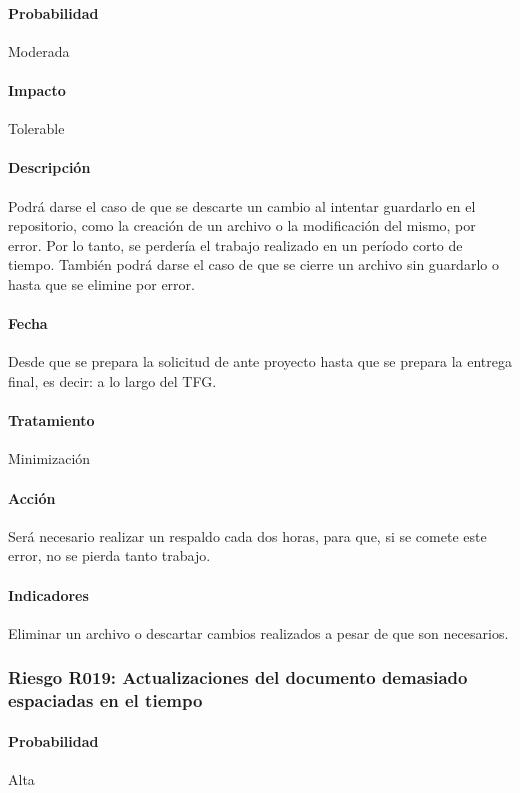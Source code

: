 \documentclass[10pt,a4paper]{article}
\begin{document}
				\paragraph{Probabilidad} Moderada
				\paragraph{Impacto}	Tolerable
				\paragraph{Descripción} Podrá darse el caso de que se descarte un cambio al intentar guardarlo en el repositorio, como la creación de un archivo o la modificación del mismo, por error. Por lo tanto, se perdería el trabajo realizado en un período corto de tiempo. También podrá darse el caso de que se cierre un archivo sin guardarlo o hasta que se elimine por error.
				\paragraph{Fecha} Desde que se prepara la solicitud de ante proyecto hasta que se prepara la entrega final, es decir: a lo largo del TFG.  %
				\paragraph{Tratamiento} Minimización %
				\paragraph{Acción} Será necesario realizar un respaldo cada dos horas, para que, si se comete este error, no se pierda tanto trabajo. %
				\paragraph{Indicadores} Eliminar un archivo o descartar cambios realizados a pesar de que son necesarios.  %
				
			\subsubsection{Riesgo R019: Actualizaciones del documento demasiado espaciadas en el tiempo}
				\paragraph{Probabilidad} Alta
\end{document}
